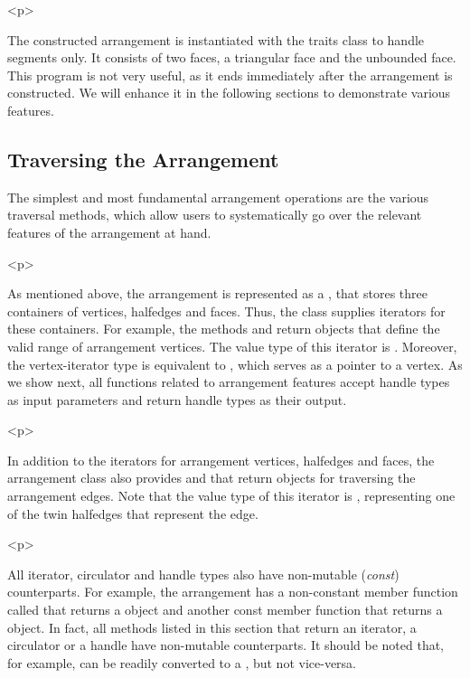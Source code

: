 \begin{ccHtmlOnly}<p>\end{ccHtmlOnly}
The constructed arrangement is instantiated with the
 traits class to handle segments only. It
consists of two faces, a triangular face and the unbounded face.
This program is not very useful, as it ends immediately after the
arrangement is constructed. We will enhance it in the following
sections to demonstrate various features.

\subsection{Traversing the Arrangement}
\label{arr_ssec:traverse}
%
The simplest and most fundamental arrangement operations are the
various traversal methods, which allow users to systematically go
over the relevant features of the arrangement at hand.

\begin{ccHtmlOnly}<p>\end{ccHtmlOnly}
As mentioned above, the arrangement is represented as a \dcel,
that stores three containers of vertices, halfedges and faces. Thus,
the  class supplies iterators for these
containers. For example, the methods  and
 return 
objects that define the valid range of arrangement vertices. The value
type of this iterator is . Moreover, the
vertex-iterator type is equivalent to
, which serves as a pointer to a
vertex. As we show next, all functions related to arrangement features
accept handle types as input parameters and return handle types as
their output.

\begin{ccHtmlOnly}<p>\end{ccHtmlOnly}
In addition to the iterators for arrangement vertices, halfedges
and faces, the arrangement class also provides 
and  that return
 objects for traversing the
arrangement edges. Note that the value type of this iterator is
, representing one of the twin
halfedges that represent the edge.

\begin{ccHtmlOnly}<p>\end{ccHtmlOnly}
All iterator, circulator and handle types also have non-mutable
({\em const}) counterparts. For example, the arrangement has a
non-constant member function called  that
returns a  object and another const member
function that returns a  object. In fact,
all methods listed in this section that return an iterator, a
circulator or a handle have non-mutable counterparts. It should be
noted that, for example,  can be readily converted
to a , but not vice-versa.

